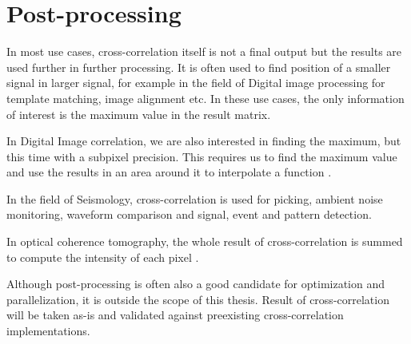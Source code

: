 \section{Post-processing}

In most use cases, cross-correlation itself is not a final output but the results are used further in further processing. It is often used to find position of a smaller signal in larger signal, for example in the field of Digital image processing for template matching, image alignment etc. In these use cases, the only information of interest is the maximum value in the result matrix. 

In Digital Image correlation, we are also interested in finding the maximum, but this time with a subpixel precision. This requires us to find the maximum value and use the results in an area around it to interpolate a function \citep{zhang2015} \citep{misko}.

In the field of Seismology, cross-correlation is used for picking, ambient noise monitoring, waveform comparison and signal, event and pattern detection. \citep{Ventosa2019}
 
In optical coherence tomography, the whole result of cross-correlation is summed to compute the intensity of each pixel \citep{Kapinchev2015}. 

Although post-processing is often also a good candidate for optimization and parallelization, it is outside the scope of this thesis. Result of cross-correlation will be taken as-is and validated against preexisting cross-correlation implementations.


